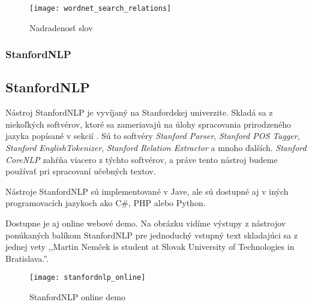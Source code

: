 \begin{figure}[H]
\begin{center}\texttt{[image: wordnet\_search\_relations]}\end{center}
\caption[Nadradenosť slov]{Nadradenosť slov}\label{fig:wordnet_relations}
\end{figure}

{
	\subsubsection{StanfordNLP}
}
{
	\subsection{StanfordNLP}
}
\label{subsubsec:stanfordnlp}
Nástroj StanfordNLP je vyvíjaný na Stanfordskej univerzite. Skladá sa z niekoľkých softvérov, ktoré sa zameriavajú na úlohy spracovania prirodzeného jazyka popísané v sekcií . Sú to softvéry \textit{Stanford Parser}, \textit{Stanford POS Tagger}, \textit{Stanford EnglishTokenizer}, \textit{Stanford Relation Extractor} a mnoho ďalších. \textit{Stanford CoreNLP} zahŕňa viacero z týchto softvérov, a práve tento nástroj budeme používať pri spracovaní učebných textov.

Nástroje StanfordNLP sú implementované v Jave, ale sú dostupné aj v iných programovacích jazykoch ako C\#, PHP alebo Python.

Dostupne je aj online webové demo. Na obrázku  vidíme výstupy z nástrojov ponúkaných balíkom StanfordNLP pre jednoduchý vstupný text skladajúci sa z jednej vety ,,Martin Nemček is student at Slovak University of Technologies in Bratislava.''.

\begin{figure}[H]
\begin{center}\texttt{[image: stanfordnlp\_online]}\end{center}
\caption[StanfordNLP online demo]{StanfordNLP online demo}\label{fig:stanfordnlp_online_demo}
\end{figure}

